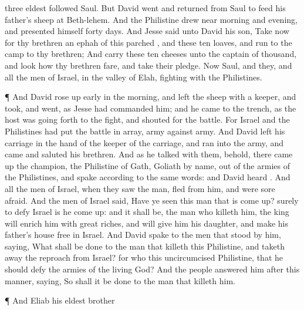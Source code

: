 {three
eldest
followed
Saul.
But
David
went and
returned from
Saul to
feed his
father’s
sheep at
Beth-lehem.
And the
Philistine drew
near
morning and
evening, and
presented himself
forty
days.
And
Jesse
said unto
David his
son,
Take now for thy
brethren an
ephah of
this
parched
{}, and these
ten
loaves, and
run to the
camp to thy
brethren;
And
carry these
ten
cheeses unto the
captain of
{}
thousand, and
look how thy
brethren
fare, and
take their
pledge.
Now
Saul, and they, and all the
men of
Israel,
{} in the
valley of
Elah,
fighting with the
Philistines.
\par }{\PP {}¶ And
David rose up
early in the
morning, and
left the
sheep with a
keeper, and
took, and
went, as
Jesse had
commanded him; and he
came to the
trench, as the
host was going
forth to the
fight, and
shouted for the
battle.
For
Israel and the
Philistines had put the battle in
array,
army
against
army.
And
David
left his
carriage in the
hand of the
keeper of the
carriage, and
ran into the
army, and
came and
saluted his
brethren.
And as he
talked with them, behold, there came
up the
champion, the
Philistine of
Gath,
Goliath by
name, out of the
armies of the
Philistines, and
spake according to the
same
words: and
David
heard
{}.
And all the
men of
Israel, when they
saw the
man,
fled from
him, and were
sore
afraid.
And the
men of
Israel
said, Have ye
seen this
man that is come
up? surely to
defy
Israel is he come
up: and it shall be,
{} the
man who
killeth him, the
king will
enrich him with
great
riches, and will
give him his
daughter, and
make his
father’s
house
free in
Israel.
And
David
spake to the
men that
stood by him,
saying, What shall be
done to the
man that
killeth
this
Philistine, and taketh
away the
reproach from
Israel? for who
{} this
uncircumcised
Philistine, that he should
defy the
armies of the
living
God?
And the
people
answered him after this
manner,
saying, So shall it be
done to the
man that
killeth him.
\par }{\PP {}¶ And
Eliab his
eldest
brother
}
